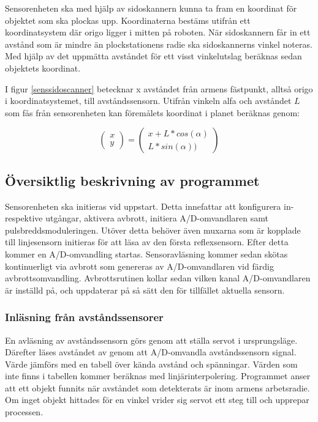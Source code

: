Sensorenheten ska med hjälp av sidoskannern kunna ta fram en koordinat för objektet som ska plockas upp. Koordinaterna bestäms utifrån ett koordinatsystem där origo ligger i mitten på roboten. När sidoskannern får in ett avstånd som är mindre än plockstationens radie ska sidoskannerns vinkel noteras. Med hjälp av det uppmätta avståndet för ett visst vinkelutslag beräknas sedan objektets koordinat.



I figur \ref{senssidoscanner} betecknar x avståndet från armens fästpunkt, alltså origo i koordinatsystemet, till avståndssensorn. Utifrån vinkeln alfa och avståndet $L$ som fås från sensorenheten kan föremålets koordinat i planet beräknas genom:

$$\begin{pmatrix}
x \\ y
\end{pmatrix}
 = 
\begin{pmatrix}
x+L*cos(\alpha) \\ 
L*sin(\alpha))
\end{pmatrix}$$


\subsection{Översiktlig beskrivning av programmet}

Sensorenheten ska initieras vid uppstart. Detta innefattar att konfigurera in- respektive utgångar, aktivera avbrott, initiera A/D-omvandlaren samt pulsbreddsmoduleringen. Utöver detta behöver även muxarna som är kopplade till linjesensorn initieras för att läsa av den första reflexsensorn. Efter detta kommer en A/D-omvandling startas. Sensoravläsning kommer sedan skötas kontinuerligt via avbrott som genereras av A/D-omvandlaren vid färdig avbrottsomvandling. Avbrottsrutinen kollar sedan vilken kanal A/D-omvandlaren är inställd på, och uppdaterar på så sätt den för tillfället aktuella sensorn.



\subsubsection{Inläsning från avståndssensorer}
En avläsning av avståndssensorn görs genom att ställa servot i ursprungsläge. Därefter läses avståndet av genom att A/D-omvandla avståndssensorn signal. Värde jämförs med en tabell över kända avstånd och spänningar. Värden som inte finns i tabellen kommer beräknas med linjärinterpolering. Programmet anser att ett objekt funnits när avståndet som detekterats är inom armens arbetsradie. Om inget objekt hittades för en vinkel vrider sig servot ett steg till och upprepar processen.

